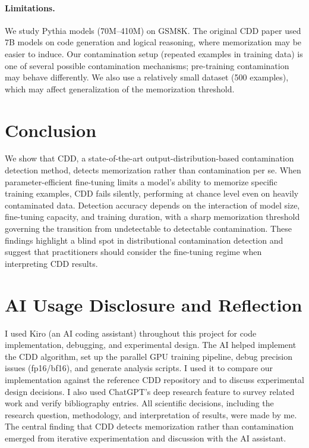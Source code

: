 \documentclass[11pt]{article}
\begin{document}
\paragraph{Limitations.} We study Pythia models (70M--410M) on GSM8K. The original CDD paper used 7B models on code generation and logical reasoning, where memorization may be easier to induce. Our contamination setup (repeated examples in training data) is one of several possible contamination mechanisms; pre-training contamination may behave differently. We also use a relatively small dataset (500 examples), which may affect generalization of the memorization threshold.

\section{Conclusion}

We show that CDD, a state-of-the-art output-distribution-based contamination detection method, detects memorization rather than contamination per se. When parameter-efficient fine-tuning limits a model's ability to memorize specific training examples, CDD fails silently, performing at chance level even on heavily contaminated data. Detection accuracy depends on the interaction of model size, fine-tuning capacity, and training duration, with a sharp memorization threshold governing the transition from undetectable to detectable contamination. These findings highlight a blind spot in distributional contamination detection and suggest that practitioners should consider the fine-tuning regime when interpreting CDD results.

\clearpage


\clearpage
\section*{AI Usage Disclosure and Reflection}

I used Kiro (an AI coding assistant) throughout this project for code implementation, debugging, and experimental design. The AI helped implement the CDD algorithm, set up the parallel GPU training pipeline, debug precision issues (fp16/bf16), and generate analysis scripts. I used it to compare our implementation against the reference CDD repository and to discuss experimental design decisions. I also used ChatGPT's deep research feature to survey related work and verify bibliography entries. All scientific decisions, including the research question, methodology, and interpretation of results, were made by me. The central finding that CDD detects memorization rather than contamination emerged from iterative experimentation and discussion with the AI assistant.
\end{document}
